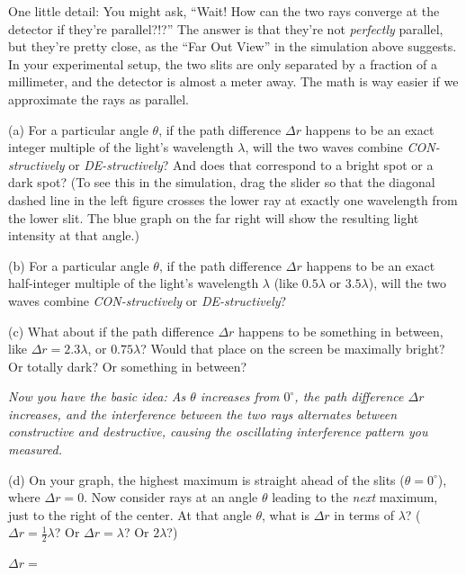 One little detail: You might ask, ``Wait!  How can the two rays converge at the detector if they're parallel?!?''  The answer is that they're not \textit{perfectly} parallel, but they're pretty close, as the ``Far Out View'' in the simulation above suggests.  In your experimental setup, the two slits are only separated by a fraction of a millimeter, and the detector is almost a meter away.  The math is way easier if we approximate the rays as parallel.


\pagebreak[2]
(a) For a particular angle $\theta$, if the path difference $\Delta r$ happens to be an exact integer multiple of the light's wavelength $\lambda$, will the two waves combine \textit{CON-structively} or \textit{DE-structively}?  And does that correspond to a bright spot or a dark spot?  (To see this in the simulation, drag the  slider so that the diagonal dashed line in the left figure crosses the lower ray at exactly one wavelength from the lower slit.  The blue graph on the far right will show the resulting light intensity at that angle.)
\answerspace{0.5in}

(b) For a particular angle $\theta$, if the path difference $\Delta r$ happens to be an exact half-integer multiple of the light's wavelength $\lambda$ (like $0.5\lambda$ or $3.5\lambda$), will the two waves combine \textit{CON-structively} or \textit{DE-structively}?
\answerspace{0.5in}

(c) What about if the path difference $\Delta r$ happens to be something in between, like $\Delta r = 2.3\lambda$, or $0.75\lambda$? Would that place on the screen be maximally bright? Or totally dark? Or something in between?
\answerspace{0.5in}

\textit{Now you have the basic idea: As $\theta$ increases from $0^\circ$,
the path difference $\Delta r$ increases, and the interference between the two rays alternates between constructive and destructive, causing the oscillating interference pattern you measured.}


(d) On your graph, the highest maximum is straight ahead of the slits ($\theta=0^\circ$), where $\Delta r=0$.  Now consider rays at an angle $\theta$ leading to the \textit{next} maximum, just to the right of the center.  At that angle $\theta$, what is $\Delta r$ in terms of $\lambda$?   ($\Delta r=\frac{1}{2}\lambda$?  Or $\Delta r = \lambda$?  Or $2\lambda$?) 

\vspace{0.1in}
\hspace{0.8in}$\Delta r=$
\vspace{0.1in}

